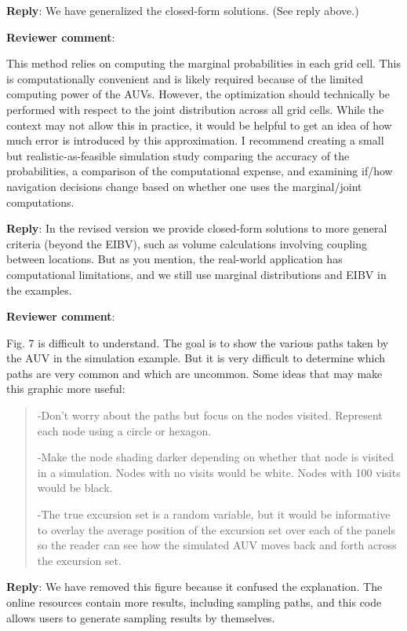 \documentclass[a4paper]{article}
\def\revcom{\textbf{Reviewer comment}}
\def\reply{\textbf{Reply}}
\begin{document}
\begin{answers}
\reply: We have generalized the closed-form solutions. (See reply above.)

\item{\revcom :}\label{r2c12}

This method relies on computing the marginal probabilities in each grid cell. This is computationally convenient and is likely required because of the limited computing power of the AUVs. However, the optimization should technically be performed with respect to the joint distribution across all grid cells. While the context may not allow this in practice, it would be helpful to get an idea of how much error is introduced by this approximation. I recommend creating a small but realistic-as-feasible simulation study comparing the accuracy of the probabilities, a comparison of the computational expense, and examining if/how navigation decisions change based on whether one uses the marginal/joint computations. 

\reply: In the revised version we provide closed-form solutions to more general criteria (beyond the EIBV), such as volume calculations involving coupling between locations. But as you mention, the real-world application has computational limitations, and we still use marginal distributions and EIBV in the examples.  

\item{\revcom :}\label{r2c13}

Fig. 7 is difficult to understand. The goal is to show the various paths taken by the AUV in the
simulation example. But it is very difficult to determine which paths are very common and which
are uncommon. Some ideas that may make this graphic more useful:

\begin{quote}
-Don’t worry about the paths but focus on the nodes visited. Represent each node using a circle or hexagon.\par
-Make the node shading darker depending on whether that node is visited in a
simulation. Nodes with no visits would be white. Nodes with 100 visits would be black.\par
-The true excursion set is a random variable, but it would be informative to overlay the
average position of the excursion set over each of the panels so the reader can see how
the simulated AUV moves back and forth across the excursion set.
\end{quote}

\reply: We have removed this figure because it confused the explanation. The online resources contain more results, including sampling paths, and this code allows users to generate sampling results by themselves. 


\end{answers}
\end{document}
